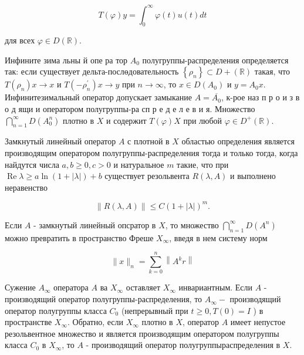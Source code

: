 \documentclass[10pt]{article}
\begin{document}
\[

T(\varphi) y=\int_{0}^{\infty} \varphi(t) u(t) d t

\]



для всех $\varphi \in D(\mathbb{R})$.



Инфините зима льны й опе ра тор $A_{0}$ полугруппы-распределения определяется так: если существует дельта-послөдовательность $\left\{\rho_{n}\right\} \subset D+(\mathbb{R})$ такая, что $T\left(\rho_{n}\right) x \rightarrow x$ и $T\left(-\rho_{n}^{\prime}\right) x \rightarrow y$ при $n \rightarrow \infty$, то $x \in D\left(A_{0}\right)$ и $y=A_{0} x$. Инфинитезимальный оператор допускает замыкание $A=\overline{A_{0}}$, к-рое наз п р о и з в о д ящи и оператором полугруппы-ра сп р е д е л е в и я. Множество $\bigcap_{n=1}^{\infty} D\left(A_{0}^{n}\right)$ плотно в $X$ и содержит $T(\varphi) X$ при любой $\varphi \in D^{+}(\mathbb{R})$.



Замкнутый линейный оператор $A$ с плотной в $X$ областью определения является производящим оператором полугруппы-распределения тогда и только тогда, когда найдутся числа $a, b \geqslant 0, c>0$ и натуральное $m$ такие, что при $\operatorname{Re} \lambda \geqslant a \ln (1+|\lambda|)+b$ существует резольвента $R(\lambda, A)$ и выполнено неравенство



\[

\|R(\lambda, A)\| \leqslant C(1+|\lambda|)^{m} .

\]



Если $A$ - замкнутый линейный опсратор в $X$, то множество $\bigcap_{n=1}^{\infty} D\left(A^{n}\right)$ можно превратить в пространство Фреше $X_{\infty}$, введя в нем систему норм



\[

\|x\|_{n}=\sum_{k=0}^{n}\left\|A^{k} r\right\|

\]



Сужение $A_{\infty}$ оператора $A$ ва $X_{\infty}$ оставляет $X_{\infty}$ инвариантным. Если $A$ - производящий оператор полугруппы-распределения, то $A_{\infty}-$ производящий оператор полугруппы класса $C_{0}$ (непрерывный при $t \geqslant 0, T(0)=I$ ) в пространстве $X_{\infty}$. Обратно, если $X_{\infty}$ плотно в $X$, оператор $A$ имеет непустое резольвентное множество и является производящим оператором полугруппы класса $C_{0}$ в $X_{\infty}$, то $A$ - производящий оператор полугруппыраспределения в $X$.
\end{document}
